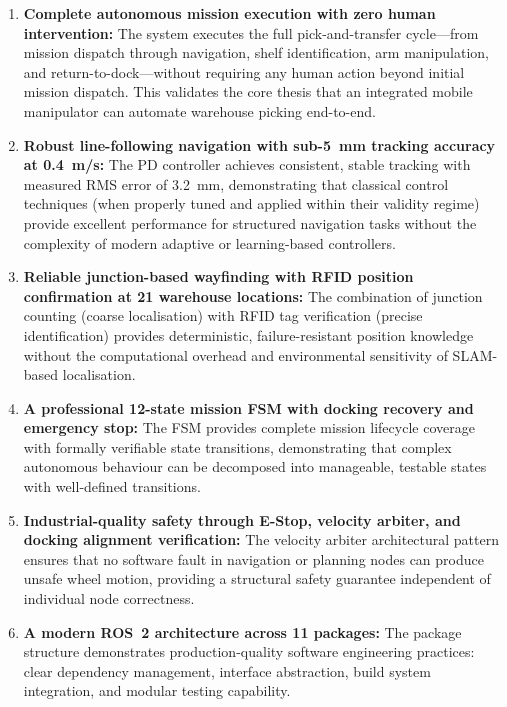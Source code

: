 \documentclass[12pt,a4paper,oneside]{report}
\begin{document}
\begin{enumerate}
\item \textbf{Complete autonomous mission execution with zero human intervention:} The system executes the full pick-and-transfer cycle---from mission dispatch through navigation, shelf identification, arm manipulation, and return-to-dock---without requiring any human action beyond initial mission dispatch. This validates the core thesis that an integrated mobile manipulator can automate warehouse picking end-to-end.

\item \textbf{Robust line-following navigation with sub-5~mm tracking accuracy at 0.4~m/s:} The PD controller achieves consistent, stable tracking with measured RMS error of 3.2~mm, demonstrating that classical control techniques (when properly tuned and applied within their validity regime) provide excellent performance for structured navigation tasks without the complexity of modern adaptive or learning-based controllers.

\item \textbf{Reliable junction-based wayfinding with RFID position confirmation at 21 warehouse locations:} The combination of junction counting (coarse localisation) with RFID tag verification (precise identification) provides deterministic, failure-resistant position knowledge without the computational overhead and environmental sensitivity of SLAM-based localisation.

\item \textbf{A professional 12-state mission FSM with docking recovery and emergency stop:} The FSM provides complete mission lifecycle coverage with formally verifiable state transitions, demonstrating that complex autonomous behaviour can be decomposed into manageable, testable states with well-defined transitions.

\item \textbf{Industrial-quality safety through E-Stop, velocity arbiter, and docking alignment verification:} The velocity arbiter architectural pattern ensures that no software fault in navigation or planning nodes can produce unsafe wheel motion, providing a structural safety guarantee independent of individual node correctness.

\item \textbf{A modern ROS~2 architecture across 11 packages:} The package structure demonstrates production-quality software engineering practices: clear dependency management, interface abstraction, build system integration, and modular testing capability.


\end{enumerate}
\end{document}
